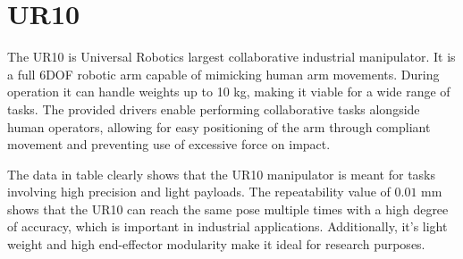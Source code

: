 \documentclass[times, utf8, diplomski, english]{fer}
\begin{document}
\section{UR10} 
The UR10 is Universal Robotics largest collaborative industrial manipulator.
It is a full 6DOF robotic arm capable of mimicking human arm movements.
During operation it can handle weights up to 10 kg, making it viable for a wide range of tasks.
The provided drivers enable performing collaborative tasks alongside human operators, allowing for easy positioning of the arm through compliant movement and preventing use of excessive force on impact.
\begin{figure}[h]
\begin{floatrow}
\end{floatrow}
\end{figure}

The data in table  clearly shows that the UR10 manipulator is meant for tasks involving high precision and light payloads. 
The repeatability value of $0.01$ mm shows that the UR10 can reach the same pose multiple times with a high degree of accuracy, which is important in industrial applications.
Additionally, it's light weight and high end-effector modularity make it ideal for research purposes.
\end{document}
